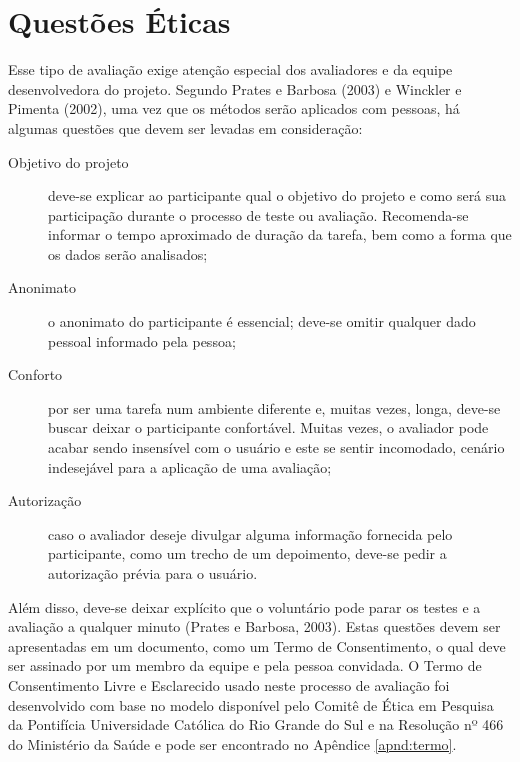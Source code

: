 %

\section{Questões Éticas}

Esse tipo de avaliação exige atenção especial dos avaliadores e da equipe desenvolvedora do projeto. Segundo Prates e Barbosa (2003) e Winckler e Pimenta (2002), uma vez que os métodos serão aplicados com pessoas, há algumas questões que devem ser levadas em consideração:
    \begin{description}
        \item [Objetivo do projeto] deve-se explicar ao participante qual o objetivo do projeto e como será sua participação durante o processo de teste ou avaliação. Recomenda-se informar o tempo aproximado de duração da tarefa, bem como a forma que os dados serão analisados;
        \item [Anonimato] o anonimato do participante é essencial; deve-se omitir qualquer dado pessoal informado pela pessoa;
        \item [Conforto] por ser uma tarefa num ambiente diferente e, muitas vezes, longa, deve-se buscar deixar o participante confortável. Muitas vezes, o avaliador pode acabar sendo insensível com o usuário e este se sentir incomodado, cenário indesejável para a aplicação de uma avaliação;
        \item [Autorização] caso o avaliador deseje divulgar alguma informação fornecida pelo participante, como um trecho de um depoimento, deve-se pedir a autorização prévia para o usuário.
    \end{description}
Além disso, deve-se deixar explícito que o voluntário pode parar os testes e a avaliação a qualquer minuto (Prates e Barbosa, 2003). Estas questões devem ser apresentadas em um documento, como um Termo de Consentimento, o qual deve ser assinado por um membro da equipe e pela pessoa convidada. O Termo de Consentimento Livre e Esclarecido usado neste processo de avaliação foi desenvolvido com base no modelo disponível pelo Comitê de Ética em Pesquisa da Pontifícia Universidade Católica do Rio Grande do Sul \cite{TCLECEP} e na Resolução nº 466 do Ministério da Saúde \cite{MSR466} e pode ser encontrado no Apêndice \ref{apnd:termo}.
\color{black}